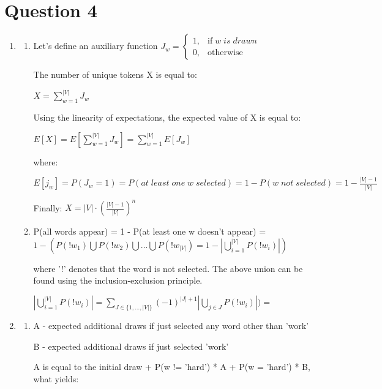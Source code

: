 \documentclass{article}
\begin{document}
\section*{Question 4} 
\begin{enumerate}[label = (\alph*)]
    \item
    \begin{enumerate}[label = (\roman*)]
    \item
    Let's define an auxiliary function $J_w = \begin{cases}
      1, & \text{if} \; w \; is \; drawn \\
      0, & \text{otherwise}
    \end{cases}$
    
    The number of unique tokens X is equal to:
    
    $X = \sum_{w=1}^{|V|} J_w$
    
    Using the linearity of expectations, the expected value of X is equal to:
    
    $E[X] = E[\sum_{w=1}^{|V|} J_w] = \sum_{w=1}^{|V|} E[J_w]$
    
    where:
    
    $E[j_w] = P(J_w = 1) = P(at \;least\; one\; w \;selected) = 1 - P(w \; not \; selected) = 1- \frac{|V|-1}{|V|}$
    
    Finally: $X = |V| \cdot (\frac{|V|-1}{|V|})^n$
    
    \item
    P(all words appear) = 1 - P(at least one w doesn't appear) = $1 - (P(!w_1) \bigcup P(!w_2) \bigcup ... \bigcup P(!w_|V|) = 1 - |\bigcup_{i=1}^{|V|}P(!w_i)|)$ 
    
    where '!' denotes that the word is not selected. 
    The above union can be found using the inclusion-exclusion principle. 
    
    $|\bigcup_{i=1}^{|V|}P(!w_i)| = \sum_{J \in \{1,...,|V|\}} (-1)^{|J|+1}|\bigcup_{j \in J}P(!w_i)|) = $
    
	\end{enumerate}
	
	\item
    \begin{enumerate}[label = (\roman*)]
    \item
    A - expected additional draws if just selected any word other than 'work'
    
    B - expected additional draws if just selected 'work'

	A is equal to the initial draw + P(w != 'hard') * A + P(w = 'hard') * B, what yields:
	

\end{enumerate}
\end{enumerate}
\end{document}
